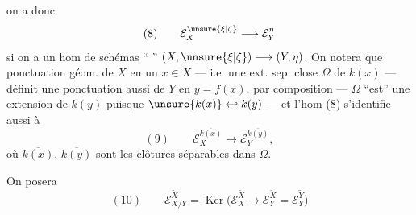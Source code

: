 
on a donc
\[
(8)\qquad \mathcal E_X^{\unsure{\xi|\zeta}}\longrightarrow\mathcal E_Y^\eta
\]
si on a un hom de schémas `` '' $(X,\unsure{\xi|\zeta})\longrightarrow(Y,\eta)$. On notera que  ponctuation géom. de $X$ en un $x\in X$ --- i.e. une ext. sep. close $\Omega$ de $k(x)$ --- définit  une ponctuation  aussi de $Y$ en $y=f(x)$,  par composition --- $\Omega$ ``est'' une extension de $k(y)$ puisque $\unsure{k(x)}\hookleftarrow k(y)$ --- et l'hom (8) s'identifie aussi à
\[
(9)\qquad \mathcal E_X^{\overline{k(x)}}\longrightarrow\mathcal E_Y^{\overline{k(y)}},
\]
où $\overline{k(x)}$, $\overline{k(y)}$ sont les clôtures séparables \uline{dans $\Omega$}.

On posera
\[
(10)\qquad \mathcal E_{X/Y}^{\widetilde X}=\operatorname{Ker}\bigl(\mathcal E_X^{\widetilde X}\longrightarrow\mathcal E_Y^{\widetilde X}=\mathcal E_Y^{\widetilde Y}\bigr)
\]

